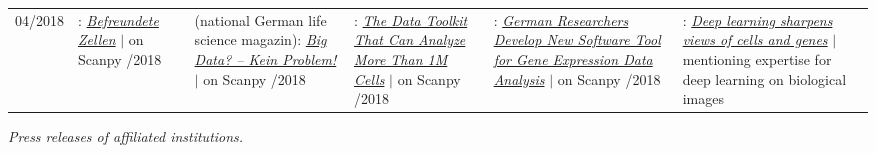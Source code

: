 \begin{longtable}[t]{R{\widthC} p{\widthB}}
04/2018
& : \href{https://www.helmholtz.de/aktuell/presse_und_medien/mediathek/wissenschaftsbild_des_monats/wissenschaftsbild/artikeldetail/befreundete_zellen/}{\textit{Befreundete Zellen}} {\footnotesize$\vert$ on Scanpy}
/2018
&  (national German life science magazin): \href{https://laborwelt.de/aktuelles/nachrichten/nachricht/big-data-kein-problem.html}{\textit{Big Data? – Kein Problem!}} {\footnotesize$\vert$ on Scanpy}
/2018
& : \href{http://www.hcanews.com/news/the-data-toolkit-that-can-analyze-more-than-1m-cells}{\textit{The Data Toolkit That Can Analyze More Than 1M Cells}} {\footnotesize$\vert$ on Scanpy}
/2018 
& : \href{https://www.genomeweb.com/informatics/german-researchers-develop-new-software-tool-gene-expression-data-analysis}{\textit{German Researchers Develop New Software Tool for Gene Expression Data Analysis}} {\footnotesize$\vert$ on Scanpy}
/2018
& : \href{https://www.nature.com/magazine-assets/d41586-018-00004-w/d41586-018-00004-w.pdf}{\textit{Deep learning sharpens views of cells and genes}} {\footnotesize$\vert$ mentioning expertise for deep learning on biological images}
\end{longtable}

\noindent \textit{Press releases of affiliated institutions.}

